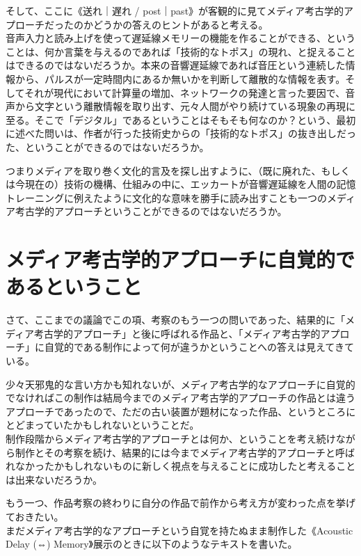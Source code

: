 \documentclass[a4paper,report]{jsbook}
\begin{document}
そして、ここに《送れ｜遅れ /
post｜past》が客観的に見てメディア考古学的アプローチだったのかどうかの答えのヒントがあると考える。\\
音声入力と読み上げを使って遅延線メモリーの機能を作ることができる、ということは、何か言葉を与えるのであれば「技術的なトポス」の現れ、と捉えることはできるのではないだろうか。本来の音響遅延線であれば音圧という連続した情報から、パルスが一定時間内にあるか無いかを判断して離散的な情報を表す。そしてそれが現代において計算量の増加、ネットワークの発達と言った要因で、音声から文字という離散情報を取り出す、元々人間がやり続けている現象の再現に至る。そこで「デジタル」であるということはそもそも何なのか？という、最初に述べた問いは、作者が行った技術史からの「技術的なトポス」の抜き出しだった、ということができるのではないだろうか。

つまりメディアを取り巻く文化的言及を探し出すように、（既に廃れた、もしくは今現在の）技術の機構、仕組みの中に、エッカートが音響遅延線を人間の記憶トレーニングに例えたように文化的な意味を勝手に読み出すことも一つのメディア考古学的アプローチということができるのではないだろうか。

\section{メディア考古学的アプローチに自覚的であるということ}\label{ux30e1ux30c7ux30a3ux30a2ux8003ux53e4ux5b66ux7684ux30a2ux30d7ux30edux30fcux30c1ux306bux81eaux899aux7684ux3067ux3042ux308bux3068ux3044ux3046ux3053ux3068}

さて、ここまでの議論でこの項、考察のもう一つの問いであった、結果的に「メディア考古学的アプローチ」と後に呼ばれる作品と、「メディア考古学的アプローチ」に自覚的である制作によって何が違うかということへの答えは見えてきている。

少々天邪鬼的な言い方かも知れないが、メディア考古学的なアプローチに自覚的でなければこの制作は結局今までのメディア考古学的アプローチの作品とは違うアプローチであったので、ただの古い装置が題材になった作品、というところにとどまっていたかもしれないということだ。\\
制作段階からメディア考古学的アプローチとは何か、ということを考え続けながら制作とその考察を続け、結果的には今までメディア考古学的アプローチと呼ばれなかったかもしれないものに新しく視点を与えることに成功したと考えることは出来ないだろうか。

もう一つ、作品考察の終わりに自分の作品で前作から考え方が変わった点を挙げておきたい。\\
まだメディア考古学的なアプローチという自覚を持たぬまま制作した《Acoustic
Delay (⇔) Memory》展示のときに以下のようなテキストを書いた。
\end{document}
